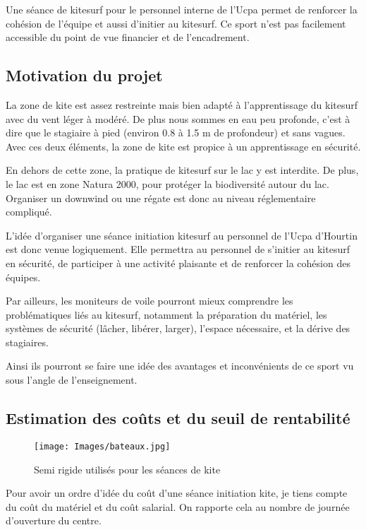 \documentclass[11pt,a4paper]{report}
\begin{document}
Une séance de kitesurf pour le personnel interne de l'Ucpa 
permet de renforcer la cohésion de l'équipe et aussi d'initier au kitesurf.
Ce sport n'est pas facilement  accessible du point de vue financier et
de l'encadrement.



\subsection{Motivation du projet}
La zone de kite est assez restreinte mais bien adapté à l'apprentissage
du kitesurf avec du vent léger à modéré. De plus nous sommes en 
eau peu profonde, c'est à dire que le stagiaire à pied (environ 0.8 à 1.5 m
de profondeur) et sans vagues. Avec ces deux éléments, la zone de kite 
est propice à un apprentissage en sécurité.

En dehors de cette zone, la pratique de kitesurf sur le lac
y est interdite. De plus, le lac est en zone Natura 2000\cite{natura2000}, pour
protéger la biodiversité autour du lac.
Organiser un downwind ou une régate est donc au niveau
réglementaire compliqué. 

L'idée d'organiser une séance initiation kitesurf
au personnel de l'Ucpa d'Hourtin est donc venue logiquement.
Elle permettra au personnel de s'initier au kitesurf en 
sécurité, de participer à une activité plaisante
et de renforcer la cohésion des équipes.

Par ailleurs, les moniteurs de voile pourront mieux
comprendre les problématiques liés au kitesurf, notamment
la préparation du matériel, les  systèmes de sécurité 
(lâcher, libérer, larger), l'espace nécessaire, et la dérive des stagiaires.

Ainsi ils pourront se faire une idée des avantages et
inconvénients de ce sport vu sous l'angle de  l'enseignement.

\subsection{Estimation des co\^uts et du seuil de rentabilité}

\begin{figure}
\centering
\texttt{[image: Images/bateaux.jpg]} 
\caption{Semi rigide utilisés pour les séances de kite\label{bateaux}}
\end{figure}
Pour avoir un ordre d'idée du coût d'une séance initiation kite, je
tiens compte du co\^ut du matériel et du co\^ut salarial. On rapporte 
cela au nombre de journée d'ouverture du centre.
\end{document}
